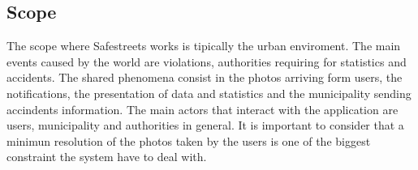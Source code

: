 \subsection{Scope}
The scope where Safestreets works is tipically the urban enviroment. The main events caused by the world are violations, authorities requiring for statistics and accidents.
The shared phenomena consist in the photos arriving form users, the notifications, the presentation of data and statistics and the municipality sending accindents information.  
The main actors that interact with the application are users, municipality and authorities in general.
It is important to consider that a minimun resolution of the photos taken by the users is one of the biggest constraint the system have to deal with.

